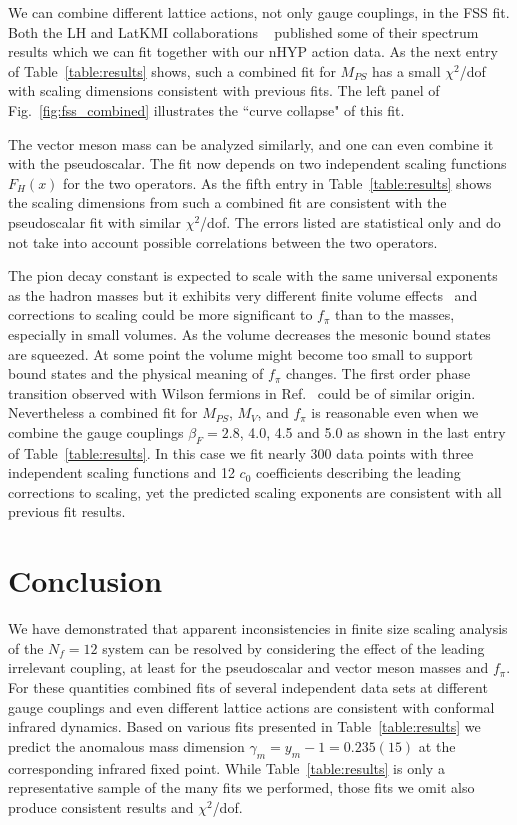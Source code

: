 \documentclass[aps,prl,twocolumn,]{revtex4-1}  %
\newcommand{\refcite}[1]{Ref.~\cite{#1}}
\newcommand{\fig}[1]{Fig.~\ref{#1}}
\begin{document}
We can  combine  different lattice actions, not only  gauge couplings,  in the FSS fit. Both the LH and LatKMI collaborations ~\protect\cite{Fodor:2011tu,Aoki:2012eq} published some of their spectrum results which we can fit together with our nHYP action data. As the  next entry of Table~\ref{table:results} shows, such a combined fit  for $M_{PS}$ has a  small $\chi^2$/dof  with scaling dimensions consistent with previous fits.  The left panel of \fig{fig:fss_combined} illustrates the ``curve collapse" of this fit. 

The vector meson mass can be analyzed similarly,  and one can even combine it with the pseudoscalar. The fit now depends on
two independent scaling functions $F_H(x)$ for the two operators.
As the fifth entry in Table~\ref{table:results}  shows  the scaling dimensions from such a combined fit are consistent with the pseudoscalar fit  with similar $\chi^2$/dof. 
The  errors listed are statistical only and do not take into account possible correlations between the two operators.
 

The pion decay constant   is expected to scale with the same universal exponents as the hadron masses but it exhibits very different finite volume effects~\cite{Fodor:2011tu,Aoki:2012eq} and  corrections to  scaling could be more significant to $f_\pi$ than to the masses, especially in small volumes. As the volume decreases the mesonic bound states are squeezed.  At some point the volume might become too small to support bound states and the physical meaning of $f_\pi$ changes. The first order phase transition observed with Wilson fermions in \refcite{Ishikawa:2013tua} could be of similar origin.   Nevertheless a combined fit for $M_{PS}$, $M_V$, and $f_\pi$ is reasonable even when we combine the  gauge couplings $\beta_F=2.8$, 4.0, 4.5 and 5.0 as shown in the last entry of Table~\ref{table:results}.
In this case we fit nearly 300 data points with three independent scaling functions and 12 $c_0$ coefficients describing the leading corrections to scaling, yet the predicted scaling exponents are consistent with all previous fit results. 


\section{Conclusion}
We have demonstrated that apparent inconsistencies in finite size scaling analysis of the $N_f=12$ system can be resolved by considering the effect of the leading irrelevant  coupling, at least for the pseudoscalar and vector meson masses and $f_\pi$.
For these quantities combined fits of several independent data sets  at different gauge couplings and even different lattice actions are consistent with conformal infrared dynamics.  Based on  various fits presented in Table~\ref{table:results} we predict the anomalous mass dimension $\gamma_m=y_m-1=0.235(15)$ at the corresponding infrared fixed point.
While Table~\ref{table:results} is only a representative sample of the many fits we performed, those fits we omit also produce consistent results and $\chi^2$/dof.
\end{document}
